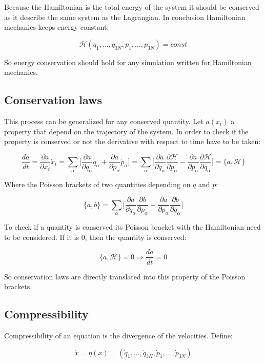 	Because the Hamiltonian is the total energy of the system it should be conserved as it describe the same system as the Lagrangian.
	In conclusion Hamiltonian mechanics keeps energy constant:

	$$\mathcal{H}(q_1, \dots, q_{3N}, p_1, \dots, p_{3N}) = const$$

	So energy conservation should hold for any simulation written for Hamiltonian mechanics.

	\subsection{Conservation laws}
	This process can be generalized for any conserved quantity.
	Let $a(x_t)$ a property that depend on the trajectory of the system.
	In order to check if the property is conserved or not the derivative with respect to time have to be taken:

	$$\frac{da}{dt} = \frac{\partial a}{\partial x_t} \dot{x}_t = \sum\limits_\alpha\biggl[\frac{\partial a}{\partial q_\alpha}\dot{q}_\alpha + \frac{\partial a}{\partial p_\alpha}\dot{p}_\alpha\biggr] = \sum\limits_\alpha\biggl[\frac{\partial a}{\partial q_\alpha}\frac{\partial\mathcal{H}}{\partial p_\alpha} - \frac{\partial a}{\partial p_\alpha}\frac{\partial\mathcal{H}}{\partial q_\alpha}\biggr] = \{a, \mathcal{H}\}$$

	Where the Poisson brackets of two quantities depending on $q$ and $p$:

	$$\{a, b\} = \sum\limits_\alpha\biggl[\frac{\partial a}{\partial q_\alpha}\frac{\partial b}{\partial p_\alpha} - \frac{\partial a}{\partial p_\alpha}\frac{\partial b}{\partial q_\alpha}\biggr]$$

	To check if a quantity is conserved its Poisson bracket with the Hamiltonian need to be considered.
	If it is $0$, then the quantity is conserved:

	$$\{a, \mathcal{H}\} = 0\Rightarrow\frac{da}{dt} = 0$$

	So conservation laws are directly translated into this property of the Poisson brackets.

	\subsection{Compressibility}
	Compressibility of an equation is the divergence of the velocities.
	Define:

	$$\dot{x} = \eta(x) = (\dot{q}_1, \dots, \dot{q}_{3N}, \dot{p}_1, \dots, \dot{p}_{3N})$$

